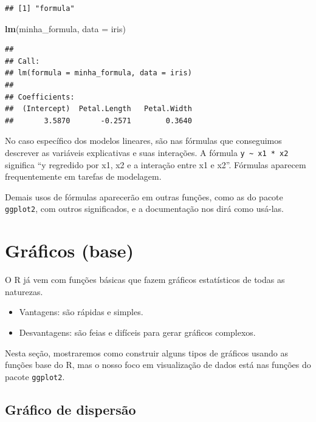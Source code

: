 \documentclass[
]{book}
\newenvironment{Shaded}{\begin{snugshade}}{\end{snugshade}}
\newcommand{\DataTypeTok}[1]{\textcolor[rgb]{0.13,0.29,0.53}{#1}}
\newcommand{\KeywordTok}[1]{\textcolor[rgb]{0.13,0.29,0.53}{\textbf{#1}}}
\newcommand{\NormalTok}[1]{#1}
\providecommand{\tightlist}{%
  \setlength{\itemsep}{0pt}\setlength{\parskip}{0pt}}
\begin{document}
\begin{verbatim}
## [1] "formula"
\end{verbatim}

\begin{Shaded}
\begin{Highlighting}[]
\KeywordTok{lm}\NormalTok{(minha\_formula, }\DataTypeTok{data =}\NormalTok{ iris)}
\end{Highlighting}
\end{Shaded}

\begin{verbatim}
## 
## Call:
## lm(formula = minha_formula, data = iris)
## 
## Coefficients:
##  (Intercept)  Petal.Length   Petal.Width  
##       3.5870       -0.2571        0.3640
\end{verbatim}

No caso específico dos modelos lineares, são nas fórmulas que conseguimos descrever as variáveis explicativas e suas interações. A fórmula \texttt{y\ \textasciitilde{}\ x1\ *\ x2} significa ``y regredido por x1, x2 e a interação entre x1 e x2''. Fórmulas aparecem frequentemente em tarefas de modelagem.

Demais usos de fórmulas aparecerão em outras funções, como as do pacote \texttt{ggplot2}, com outros significados, e a documentação nos dirá como usá-las.

\hypertarget{gruxe1ficos-base}{%
\section{Gráficos (base)}\label{gruxe1ficos-base}}

O R já vem com funções básicas que fazem gráficos estatísticos de todas as naturezas.

\begin{itemize}
\tightlist
\item
  Vantagens: são rápidas e simples.
\item
  Desvantagens: são feias e difíceis para gerar gráficos complexos.
\end{itemize}

Nesta seção, mostraremos como construir alguns tipos de gráficos usando as funções base do R, mas o nosso foco em visualização de dados está nas funções do pacote \texttt{ggplot2}.

\hypertarget{gruxe1fico-de-dispersuxe3o}{%
\subsection{Gráfico de dispersão}\label{gruxe1fico-de-dispersuxe3o}}
\end{document}
